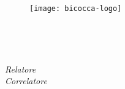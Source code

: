 \begin{titlepage}
    \begin{center}
        \begin{LARGE}
            \textbf{\myUni}\\
        \end{LARGE}

        \vspace{10pt}

        \begin{large}
            \textsc{\myDepartment}\\
        \end{large}

        \vspace{10pt}

        \begin{Large}
            \textsc{\myFaculty}\\
        \end{Large}

        \vspace{30pt}
        \begin{figure}[htbp]
            \centering
            \texttt{[image: bicocca-logo]}
        \end{figure}
        \vspace{30pt}

        \begin{LARGE}
            \textbf{\myTitle}\\
        \end{LARGE}

        \vspace{10pt}

        \begin{large}
            \textsl{\myDegree}\\
        \end{large}

        \vspace{60pt}

        \begin{large}
            \begin{flushleft}
                \textit{Relatore} \profTitle\ \myProf\\
                \vspace{10pt}
                \textit{Correlatore} \coProf\\
                
            \end{flushleft}


\end{large}
\end{center}
\end{titlepage}
